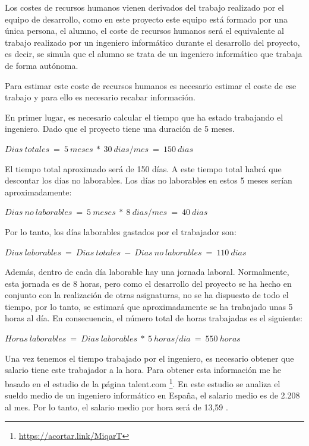 Los costes de recursos humanos vienen derivados del trabajo realizado por el equipo de desarrollo, como en este proyecto este equipo está formado por una única persona, el alumno, el coste de recursos humanos será el equivalente al trabajo realizado por un ingeniero informático durante el desarrollo del proyecto, es decir, se simula que el alumno se trata de un ingeniero informático que trabaja de forma autónoma.

Para estimar este coste de recursos humanos es necesario estimar el coste de ese trabajo y para ello es necesario recabar información.

En primer lugar, es necesario calcular el tiempo que ha estado trabajando el ingeniero. Dado que el proyecto tiene una duración de 5 meses.

\begin{center}
$Dias\ totales\ =\ 5\ meses\ *\ 30\ dias / mes\ =\ 150\ dias$
\end{center}

El tiempo total aproximado será de 150 días. A este tiempo total habrá que descontar los días no laborables. Los días no laborables en estos 5 meses serían aproximadamente:

\begin{center}
$Dias\ no\ laborables\ =\ 5\ meses\ *\ 8\ dias/mes\ =\ 40\ dias$
\end{center}

Por lo tanto, los días laborables gastados por el trabajador son:

\begin{center}
$Dias\ laborables\ =\ Dias\ totales\ -\ Dias\ no\ laborables\ =\ 110\ dias$
\end{center}

Además, dentro de cada día laborable hay una jornada laboral. Normalmente, esta jornada es de 8 horas, pero como el desarrollo del proyecto se ha hecho en conjunto con la realización de otras asignaturas, no se ha dispuesto de todo el tiempo, por lo tanto, se estimará que aproximadamente se ha trabajado unas 5 horas al día. En consecuencia, el número total de horas trabajadas es el siguiente:

\begin{center}
$Horas\ laborables\ =\ Dias\ laborables\ *\ 5\ horas/dia\ =\ 550\ horas$
\end{center}

Una vez tenemos el tiempo trabajado por el ingeniero, es necesario obtener que salario tiene este trabajador a la hora. Para obtener esta información me he basado en el estudio de la página talent.com \footnote{\url{https://acortar.link/MiqarT}}. En este estudio se analiza el sueldo medio de un ingeniero informático en España, el salario medio es de 2.208 \EURtm al mes. Por lo tanto, el salario medio por hora será de 13,59 \EURtm.

